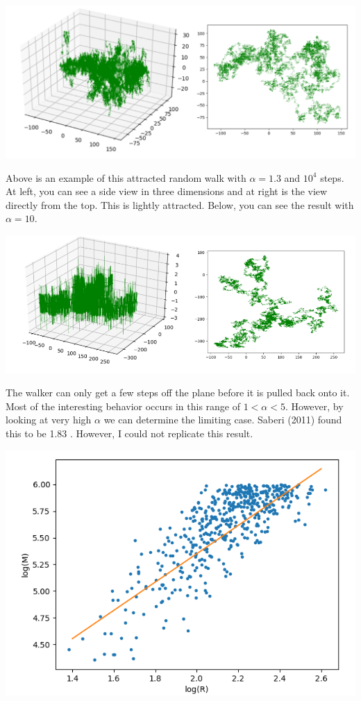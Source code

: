 \documentclass{article}
\begin{document}
\includegraphics[scale=0.45]{figs/attracted3d}

Above is an example of this attracted random walk with $\alpha=1.3$ and $10^4$ steps. At left, you can see a side view in three dimensions and at right is the view directly from the top. This is lightly attracted. Below, you can see the result with $\alpha = 10$. 

\includegraphics[scale=0.5]{figs/highlyattracted3d}

The walker can only get a few steps off the plane before it is pulled back onto it. Most of the interesting behavior occurs in this range of $1 < \alpha < 5$. However, by looking at very high $\alpha$ we can determine the limiting case. Saberi (2011) found this to be 1.83 \cite{saberi11}. However, I could not replicate this result. 

\includegraphics[scale=0.5]{figs/fit}
\end{document}
